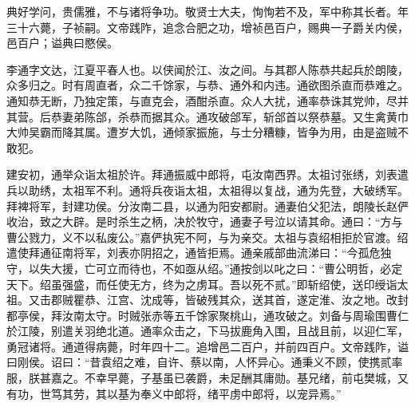 \documentclass[12pt,UTF8]{ctexbook}
\begin{document}
典好学问，贵儒雅，不与诸将争功。敬贤士大夫，恂恂若不及，军中称其长者。年三十六薨，子祯嗣。文帝践阼，追念合肥之功，增祯邑百户，赐典一子爵关内侯，邑百户；谥典曰愍侯。

李通字文达，江夏平春人也。以侠闻於江、汝之间。与其郡人陈恭共起兵於朗陵，众多归之。时有周直者，众二千馀家，与恭、通外和内违。通欲图杀直而恭难之。通知恭无断，乃独定策，与直克会，酒酣杀直。众人大扰，通率恭诛其党帅，尽并其营。后恭妻弟陈郃，杀恭而据其众。通攻破郃军，斩郃首以祭恭墓。又生禽黄巾大帅吴霸而降其属。遭岁大饥，通倾家振施，与士分糟糠，皆争为用，由是盗贼不敢犯。

建安初，通举众诣太祖於许。拜通振威中郎将，屯汝南西界。太祖讨张绣，刘表遣兵以助绣，太祖军不利。通将兵夜诣太祖，太祖得以复战，通为先登，大破绣军。拜裨将军，封建功侯。分汝南二县，以通为阳安都尉。通妻伯父犯法，朗陵长赵俨收治，致之大辟。是时杀生之柄，决於牧守，通妻子号泣以请其命。通曰：“方与曹公戮力，义不以私废公。”嘉俨执宪不阿，与为亲交。太祖与袁绍相拒於官渡。绍遣使拜通征南将军，刘表亦阴招之，通皆拒焉。通亲戚部曲流涕曰：“今孤危独守，以失大援，亡可立而待也，不如亟从绍。”通按剑以叱之曰：“曹公明哲，必定天下。绍虽强盛，而任使无方，终为之虏耳。吾以死不贰。”即斩绍使，送印绶诣太祖。又击郡贼瞿恭、江宫、沈成等，皆破残其众，送其首，遂定淮、汝之地。改封都亭侯，拜汝南太守。时贼张赤等五千馀家聚桃山，通攻破之。刘备与周瑜围曹仁於江陵，别遣关羽绝北道。通率众击之，下马拔鹿角入围，且战且前，以迎仁军，勇冠诸将。通道得病薨，时年四十二。追增邑二百户，并前四百户。文帝践阼，谥曰刚侯。诏曰：“昔袁绍之难，自许、蔡以南，人怀异心。通秉义不顾，使携贰率服，朕甚嘉之。不幸早薨，子基虽已袭爵，未足酬其庸勋。基兄绪，前屯樊城，又有功，世笃其劳，其以基为奉义中郎将，绪平虏中郎将，以宠异焉。”
\end{document}
